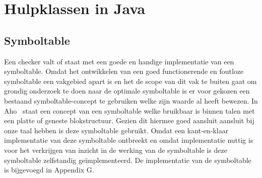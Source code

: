 \chapter{Hulpklassen in Java}
\section{Symboltable}
Een checker valt of staat met een goede en handige implementatie van een symboltable. Omdat het ontwikkelen van een goed functionerende en foutloze symboltable een vakgebied apart is en het de scope van dit vak te buiten gaat om grondig onderzoek te doen naar de optimale symboltable is er voor gekozen een bestaand symboltable-concept te gebruiken welke zijn waarde al heeft bewezen. In Aho~\cite[p.85-90]{aho2007compilers} staat een concept van een symboltable welke bruikbaar is binnen talen met een platte of geneste blokstructuur. Gezien dit hiermee goed aansluit aansluit bij onze taal hebben is deze symboltable gebruikt. Omdat een kant-en-klaar implementatie van deze symboltable ontbreekt en omdat implementatie nuttig is voor het verkrijgen van inzicht in de werking van de symboltable is deze symboltable zelfstandig ge\"{i}mplementeerd. De implementatie van de symboltable is bijgevoegd in Appendix G.
